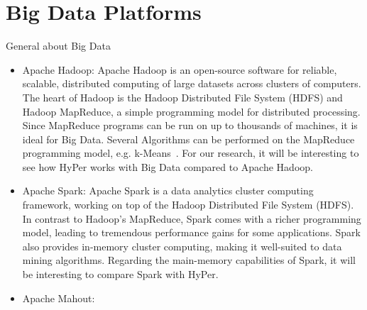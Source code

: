 \section{Big Data Platforms}
General about Big Data
\begin{itemize}
\item Apache Hadoop: Apache Hadoop is an open-source software for reliable, scalable, distributed computing of large datasets across clusters of computers. The heart of Hadoop is the Hadoop Distributed File System (HDFS) and Hadoop MapReduce, a simple programming model for distributed processing. Since MapReduce programs can be run on up to thousands of machines, it is ideal for Big Data. Several Algorithms can be performed on the MapReduce programming model, e.g. k-Means~\parencite{parallelkmeans}. For our research, it will be interesting to see how HyPer works with Big Data compared to Apache Hadoop.

\item Apache Spark: Apache Spark is a data analytics cluster computing framework, working on top of the Hadoop Distributed File System (HDFS). In contrast to Hadoop’s MapReduce, Spark comes with a richer programming model, leading to tremendous performance gains for some applications. Spark also provides in-memory cluster computing, making it well-suited to data mining algorithms. Regarding the main-memory capabilities of Spark, it will be interesting to compare Spark with HyPer.

\item Apache Mahout:
\end{itemize}

